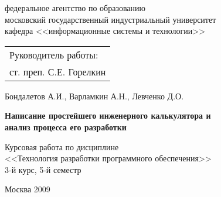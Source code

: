 \thispagestyle{empty}

\vspace*{-\headheight}\vspace*{-\headsep}

{\centering
{\sc
федеральное агентство по образованию\\
московский государственный индустриальный университет\\
кафедра <<информационные системы и технологии>>\\
}


\vspace{4cm plus 1mm minus 1mm}

\begin{flushright}
\begin{tabular}{l}
Руководитель работы:\\
ст. преп. С.Е. Горелкин
\end{tabular}
\end{flushright}

\vspace{3cm plus 1mm minus 1mm}

Бондалетов А.И., Варламкин А.Н., Левченко Д.О.

\vspace{1cm plus 1mm minus 1mm}
{\large\bf
Написание простейшего инженерного калькулятора и \\
анализ процесса его разработки
}

\vspace{1cm plus 1mm minus 1mm}

Курсовая работа по дисциплине\\
<<Технология разработки программного обеспечения>>\\
3-й курс, 5-й семестр

\vfill

Москва 2009

}

\newpage
\endinput

